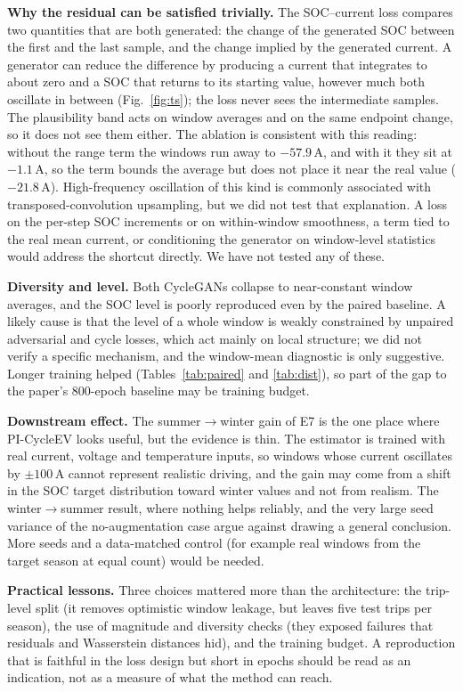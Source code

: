 \documentclass[conference]{IEEEtran}
\begin{document}
\textbf{Why the residual can be satisfied trivially.} The SOC--current loss compares two quantities that are both generated: the change of the generated SOC between the first and the last sample, and the change implied by the generated current. A generator can reduce the difference by producing a current that integrates to about zero and a SOC that returns to its starting value, however much both oscillate in between (Fig.~\ref{fig:ts}); the loss never sees the intermediate samples. The plausibility band acts on window averages and on the same endpoint change, so it does not see them either. The ablation is consistent with this reading: without the range term the windows run away to $-57.9$\,A, and with it they sit at $-1.1$\,A, so the term bounds the average but does not place it near the real value ($-21.8$\,A). High-frequency oscillation of this kind is commonly associated with transposed-convolution upsampling, but we did not test that explanation. A loss on the per-step SOC increments or on within-window smoothness, a term tied to the real mean current, or conditioning the generator on window-level statistics would address the shortcut directly. We have not tested any of these.

\textbf{Diversity and level.} Both CycleGANs collapse to near-constant window averages, and the SOC level is poorly reproduced even by the paired baseline. A likely cause is that the level of a whole window is weakly constrained by unpaired adversarial and cycle losses, which act mainly on local structure; we did not verify a specific mechanism, and the window-mean diagnostic is only suggestive. Longer training helped (Tables~\ref{tab:paired} and \ref{tab:dist}), so part of the gap to the paper's 800-epoch baseline may be training budget.

\textbf{Downstream effect.} The summer$\rightarrow$winter gain of E7 is the one place where PI-CycleEV looks useful, but the evidence is thin. The estimator is trained with real current, voltage and temperature inputs, so windows whose current oscillates by $\pm100$\,A cannot represent realistic driving, and the gain may come from a shift in the SOC target distribution toward winter values and not from realism. The winter$\rightarrow$summer result, where nothing helps reliably, and the very large seed variance of the no-augmentation case argue against drawing a general conclusion. More seeds and a data-matched control (for example real windows from the target season at equal count) would be needed.

\textbf{Practical lessons.} Three choices mattered more than the architecture: the trip-level split (it removes optimistic window leakage, but leaves five test trips per season), the use of magnitude and diversity checks (they exposed failures that residuals and Wasserstein distances hid), and the training budget. A reproduction that is faithful in the loss design but short in epochs should be read as an indication, not as a measure of what the method can reach.
\end{document}
